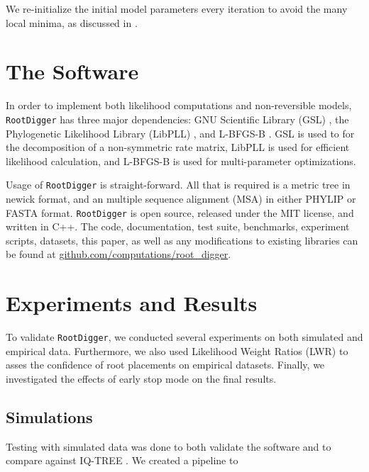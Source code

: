 \documentclass{article}
\newcommand{\RootDiggertt}{\texttt{RootDigger}}
\begin{document}
We re-initialize the initial model parameters every iteration to avoid the many
local minima, as discussed in \cite{huelsenbeck_inferring_2002}. 

\section{The Software}

In order to implement both likelihood computations and non-reversible models,
\RootDiggertt{} has three major dependencies: GNU Scientific Library (GSL)
\cite{gough_gnu_2009}, the Phylogenetic Likelihood Library (LibPLL)
\cite{flouri_phylogenetic_2015}, and L-BFGS-B \cite{zhu_algorithm_1997}.  GSL is
used to for the decomposition of a non-symmetric rate matrix, LibPLL is used for
efficient likelihood calculation, and L-BFGS-B is used for multi-parameter
optimizations.

Usage of \RootDiggertt{} is straight-forward. All that is required is a metric
tree in newick format, and an multiple sequence alignment (MSA) in either PHYLIP
or FASTA format. \RootDiggertt{} is open source, released under the MIT license,
and written in C++. The code, documentation, test suite, benchmarks, experiment
scripts, datasets, this paper, as well as any modifications to existing
libraries can be found at \url{github.com/computations/root_digger}.

\section{Experiments and Results}

To validate \RootDiggertt{}, we conducted several experiments on both simulated
and empirical data. Furthermore, we also used Likelihood Weight Ratios (LWR)
\cite{strimmer_inferring_2002} to asses the confidence of root placements on
empirical datasets. Finally, we investigated the effects of early stop mode on the
final results.

\subsection{Simulations}

Testing with simulated data was done to both validate the software and to
compare against IQ-TREE \cite{minh_iq-tree_2019}.
We created a pipeline to
\end{document}
